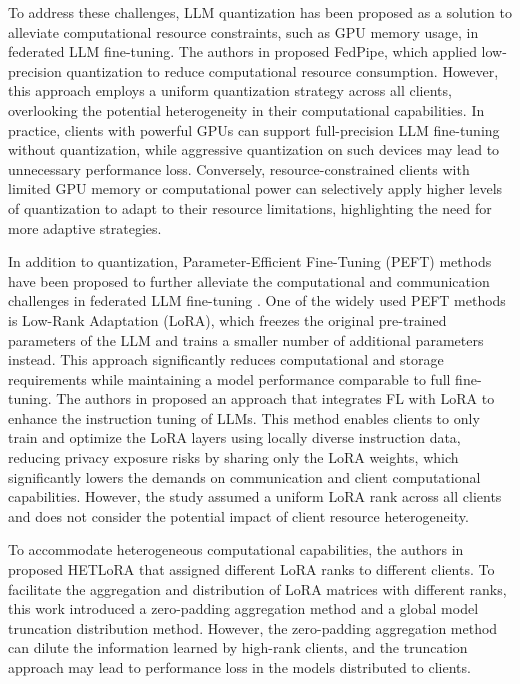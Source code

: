 \documentclass[journal]{IEEEtran}
\begin{document}
To address these challenges, LLM quantization \cite{zhou2024survey, zhu2024survey,kim2024efficient} has been proposed as a solution to alleviate computational resource constraints, such as GPU memory usage, in federated LLM fine-tuning. The authors in \cite{fang2024automated} proposed FedPipe, which applied low-precision quantization to reduce computational resource consumption. However, this approach employs a uniform quantization strategy across all clients, overlooking the potential heterogeneity in their computational capabilities. In practice, clients with powerful GPUs can support full-precision LLM fine-tuning without quantization, while aggressive quantization on such devices may lead to unnecessary performance loss. Conversely, resource-constrained clients with limited GPU memory or computational power can selectively apply higher levels of quantization to adapt to their resource limitations, highlighting the need for more adaptive strategies.

In addition to quantization, Parameter-Efficient Fine-Tuning (PEFT) methods have been proposed to further alleviate the computational and communication challenges in federated LLM fine-tuning \cite{han2024parameter,xu2023parameter,zhang2025parameter}. 
One of the widely used PEFT methods is Low-Rank Adaptation (LoRA), which freezes the original pre-trained parameters of the LLM and trains a smaller number of additional parameters instead\cite{hu2021lora}. This approach significantly reduces computational and storage requirements while maintaining a model performance comparable to full fine-tuning.
The authors in \cite{zhang2024towards} proposed an approach that integrates FL with LoRA to enhance the instruction tuning of LLMs. This method enables clients to only train and optimize the LoRA layers using locally diverse instruction data, reducing privacy exposure 
risks by sharing only the LoRA weights, which significantly lowers the demands on communication and client computational capabilities. However, the study assumed a uniform LoRA rank across all clients and does not consider the potential impact of client resource heterogeneity.


To accommodate heterogeneous computational capabilities, the authors in \cite{cho2023heterogeneous} proposed HETLoRA that assigned different LoRA ranks to different clients. 
To facilitate the aggregation and distribution of LoRA matrices with different ranks, this work introduced a zero-padding aggregation method and a global model truncation distribution method. However, the zero-padding aggregation method can dilute the information learned by high-rank clients, and the truncation approach may lead to performance loss in the models distributed to clients.
\end{document}
